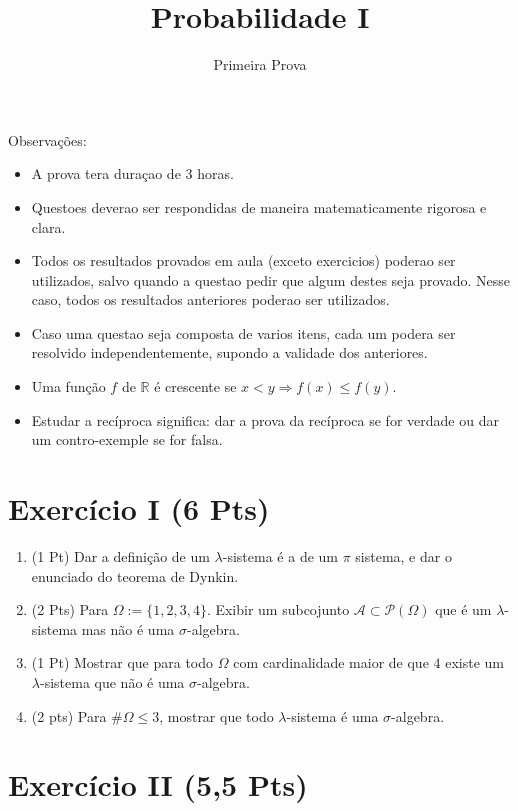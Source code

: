 \documentclass{article}
\newcommand{\cA}{\ensuremath{\mathcal A}}
\newcommand{\cP}{\ensuremath{\mathcal P}}
\newcommand{\bbR}{{\ensuremath{\mathbb R}} }
\newcommand{\1}[1]{{\mathbf 1}\left(#1\right)}
\newcommand{\gO}{\Omega}
\newcommand{\gl}{\lambda}
\begin{document}
\title{Probabilidade I}
\author{Primeira Prova}

\maketitle

\noindent Observa\c{c}\~oes:
\begin{itemize}
\item A prova tera duraçao de $3$ horas.
\item Questoes deverao ser respondidas de maneira matematicamente rigorosa e clara.
\item Todos os resultados provados em aula (exceto exercicios) poderao ser utilizados, salvo quando a questao pedir que algum destes seja provado. Nesse caso, todos os resultados anteriores poderao ser utilizados.
\item Caso uma questao seja composta de varios itens, cada um podera ser resolvido independentemente, supondo a validade dos anteriores.
\item Uma função $f$ de $\bbR$ é crescente se $x<y \Rightarrow f(x)\le f(y)$.
\item Estudar a recíproca significa: dar a prova da recíproca se for verdade ou  dar um contro-exemple se for falsa.
\end{itemize}


\section*{Exercício I {\small (6 Pts)}}

\begin{enumerate}
\item (1 Pt) Dar a definição de um $\gl$-sistema é a de um $\pi$ sistema, e dar o enunciado do teorema de Dynkin.
\item (2 Pts) Para $\gO:=\{1,2,3,4\}$. Exibir um subcojunto $\cA \subset \cP(\gO)$ que é um $\lambda$-sistema mas não é uma $\sigma$-algebra.
\item (1 Pt) Mostrar que para todo $\gO$ com cardinalidade maior de que $4$ existe um $\lambda$-sistema que não é uma $\sigma$-algebra.
\item (2 pts) Para $\#\gO\le 3$, mostrar que todo $\gl$-sistema é uma $\sigma$-algebra.
\end{enumerate}




\section*{Exercício II {\small (5,5 Pts)}}
\end{document}
